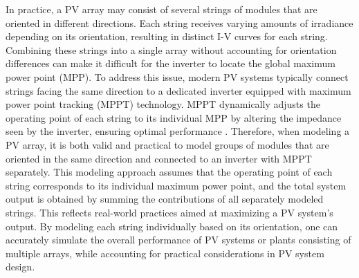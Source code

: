 In practice, a PV array may consist of several strings of modules
that are oriented in different directions. Each string receives
varying amounts of irradiance depending on its orientation,
resulting in distinct I-V curves for each string. Combining
these strings into a single array without accounting for
orientation differences can make it difficult for the inverter
to locate the global maximum power point (MPP). To address
this issue, modern PV systems typically connect strings facing
the same direction to a dedicated inverter equipped with maximum
power point tracking (MPPT) technology. MPPT dynamically adjusts
the operating point of each string to its individual MPP by
altering the impedance seen by the inverter, ensuring optimal
performance \cite[p. 152f]{Mayfield}. Therefore, when modeling
a PV array, it is both valid and practical to model groups of
modules that are oriented in the same direction and connected
to an inverter with MPPT separately. This modeling approach
assumes that the operating point of each string corresponds
to its individual maximum power point, and the total system
output is obtained by summing the contributions of all separately
modeled strings. This reflects real-world practices aimed at
maximizing a PV system's output. By modeling each string
individually based on its orientation, one can accurately
simulate the overall performance of PV systems or plants
consisting of multiple arrays, while accounting for practical
considerations in PV system design.

